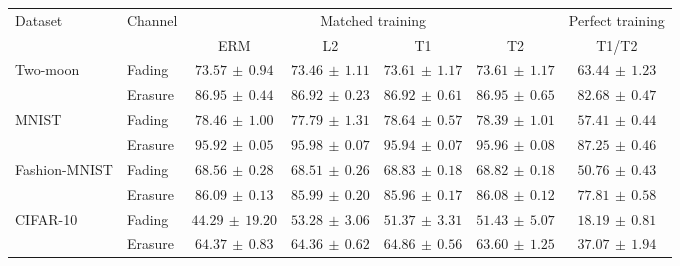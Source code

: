 \begin{tabular*}{\linewidth}{@{\extracolsep{\fill}}llccccc@{}}
\toprule
\multirow{2}{*}{Dataset} & \multirow{2}{*}{Channel} & \multicolumn{4}{c}{Matched training} & Perfect training \\
\cmidrule(lr){3-6}\cmidrule(l){7-7}
 & & ERM & L2 & T1 & T2 & T1/T2 \\
\midrule
\multirow{2}{*}{Two-moon} & Fading & $73.57\,\pm\,0.94$ & $73.46\,\pm\,1.11$ & $73.61\,\pm\,1.17$ & $\mathbf{73.61}\,\pm\,1.17$ & $63.44\,\pm\,1.23$ \\
 & Erasure & $86.95\,\pm\,0.44$ & $86.92\,\pm\,0.23$ & $86.92\,\pm\,0.61$ & $\mathbf{86.95}\,\pm\,0.65$ & $82.68\,\pm\,0.47$ \\
\midrule[0.25pt]
\multirow{2}{*}{MNIST} & Fading & $78.46\,\pm\,1.00$ & $77.79\,\pm\,1.31$ & $\mathbf{78.64}\,\pm\,0.57$ & $78.39\,\pm\,1.01$ & $57.41\,\pm\,0.44$ \\
 & Erasure & $95.92\,\pm\,0.05$ & $\mathbf{95.98}\,\pm\,0.07$ & $95.94\,\pm\,0.07$ & $95.96\,\pm\,0.08$ & $87.25\,\pm\,0.46$ \\
\midrule[0.25pt]
\multirow{2}{*}{Fashion-MNIST} & Fading & $68.56\,\pm\,0.28$ & $68.51\,\pm\,0.26$ & $\mathbf{68.83}\,\pm\,0.18$ & $68.82\,\pm\,0.18$ & $50.76\,\pm\,0.43$ \\
 & Erasure & $\mathbf{86.09}\,\pm\,0.13$ & $85.99\,\pm\,0.20$ & $85.96\,\pm\,0.17$ & $86.08\,\pm\,0.12$ & $77.81\,\pm\,0.58$ \\
\midrule[0.25pt]
\multirow{2}{*}{CIFAR-10} & Fading & $44.29\,\pm\,19.20$ & $\mathbf{53.28}\,\pm\,3.06$ & $51.37\,\pm\,3.31$ & $51.43\,\pm\,5.07$ & $18.19\,\pm\,0.81$ \\
 & Erasure & $64.37\,\pm\,0.83$ & $64.36\,\pm\,0.62$ & $\mathbf{64.86}\,\pm\,0.56$ & $63.60\,\pm\,1.25$ & $37.07\,\pm\,1.94$ \\
\bottomrule
\end{tabular*}
